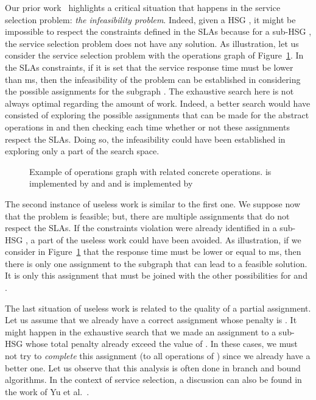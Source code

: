 \documentclass[a4paper]{article}
\begin{document}
Our prior work~\cite{JISA} highlights a critical situation that happens in the service selection 
problem: {\it the infeasibility problem}. Indeed, given a HSG , it might be impossible to respect the 
constraints defined in the SLAs  because for a sub-HSG , the service selection 
problem does not have any solution. As illustration, let us consider the service selection problem with the 
operations graph of Figure~\ref{noSolution}. In the SLAs constraints, if it is set that the service response time must 
be lower than ms, then the infeasibility of the problem can be established in considering the 
possible assignments for the subgraph . 
The exhaustive search here is not always optimal regarding the amount of work. Indeed,  
a better search would have consisted of exploring the possible assignments that can be made for the 
abstract operations in  and then checking each time whether or not these assignments respect the SLAs.  
Doing so, the infeasibility  could have been established in exploring only a part of the 
search space. 

\begin{figure}[htbp]
\centering
{}
\caption{Example of operations graph with related concrete operations. 
 is implemented by  and  and  is implemented by }\label{noSolution}
\end{figure}


The second instance of useless work  is similar to the first one. We suppose 
now that the problem is feasible; but, there are multiple assignments that do not respect the 
SLAs. If the constraints violation were already identified in a sub-HSG , a part of the 
useless work could have been avoided. As illustration, if we consider in 
Figure~\ref{noSolution} that the response time must be lower or equal to ms, then there is 
only one assignment to the subgraph  that can lead to a feasible solution. 
It is only this assignment that must be joined with the other possibilities for  and .

The last situation of useless work is related to the quality of a partial assignment. 
Let us assume that we already have a correct assignment whose penalty is . It might happen in the 
exhaustive search that we made an assignment to a sub-HSG  whose total penalty already exceed the value of . 
In these cases, we must not try to {\it complete} this assignment (to all operations of ) since we already have a 
better one. Let us observe that this analysis is often done in branch and bound algorithms. In the 
context of service selection, a discussion can also be found in the work of Yu et al.~\cite{Yu}.
\end{document}
